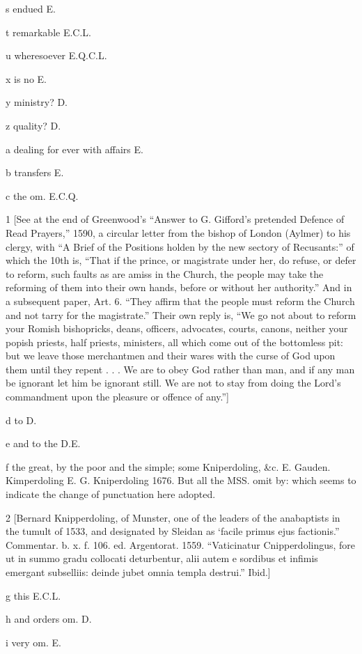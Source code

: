 s
endued E.

t
remarkable E.C.L.

u
wheresoever E.Q.C.L.

x
is no E.

y
ministry? D.

z
quality? D.

a
dealing for ever with affairs E.

b
transfers E.

c
the om. E.C.Q.

1
[See at the end of Greenwood’s “Answer to G. Gifford’s pretended Defence of Read Prayers,” 1590, a circular letter from the bishop of London (Aylmer) to his clergy, with “A Brief of the Positions holden by the new sectory of Recusants:” of which the 10th is, “That if the prince, or magistrate under her, do refuse, or defer to reform, such faults as are amiss in the Church, the people may take the reforming of them into their own hands, before or without her authority.” And in a subsequent paper, Art. 6. “They affirm that the people must reform the Church and not tarry for the magistrate.” Their own reply is, “We go not about to reform your Romish bishopricks, deans, officers, advocates, courts, canons, neither your popish priests, half priests, ministers, all which come out of the bottomless pit: but we leave those merchantmen and their wares with the curse of God upon them until they repent . . . We are to obey God rather than man, and if any man be ignorant let him be ignorant still. We are not to stay from doing the Lord’s commandment upon the pleasure or offence of any.”]

d
to D.

e
and to the D.E.

f
the great, by the poor and the simple; some Kniperdoling, &c. E. Gauden. Kimperdoling E. G. Kniperdoling 1676. But all the MSS. omit by: which seems to indicate the change of punctuation here adopted.

2
[Bernard Knipperdoling, of Munster, one of the leaders of the anabaptists in the tumult of 1533, and designated by Sleidan as ‘facile primus ejus factionis.” Commentar. b. x. f. 106. ed. Argentorat. 1559. “Vaticinatur Cnipperdolingus, fore ut in summo gradu collocati deturbentur, alii autem e sordibus et infimis emergant subselliis: deinde jubet omnia templa destrui.” Ibid.]

g
this E.C.L.

h
and orders om. D.

i
very om. E.

